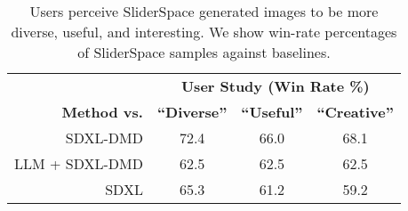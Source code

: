 \begin{table}
    \centering
    \small
    \begin{tabular}{rccc}
         & \multicolumn{3}{c}{\textbf{User Study (Win Rate \%)}} \\
        \textbf{Method vs.} & \textbf{``Diverse''} & \textbf{``Useful''}  & \textbf{``Creative''} \\
        \hline
        SDXL-DMD &  72.4 & 66.0 & 68.1 \\
        LLM + SDXL-DMD & 62.5 & 62.5 & 62.5 \\
        SDXL & 65.3 & 61.2 & 59.2  \\

    \end{tabular}
    \caption{Users perceive SliderSpace generated images to be more diverse, useful, and interesting. We show win-rate percentages of SliderSpace samples against baselines.}
    \label{tab:userconcept}
\end{table}